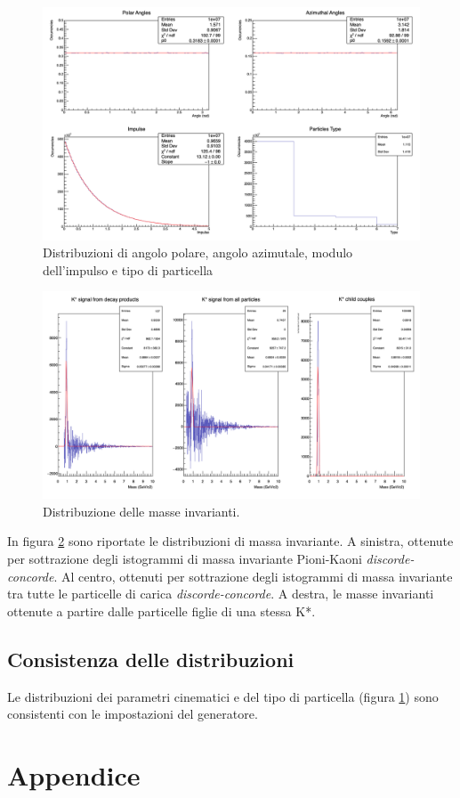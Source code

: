 \documentclass[12pt, a4paper]{article}
\begin{document}
\begin{figure}[H]
\centering
\includegraphics[scale=0.4]{images/DistributionsCanvas.png}

\label{fig:fig1}
\caption{Distribuzioni di angolo polare, angolo azimutale, modulo dell'impulso e tipo di particella}
\end{figure}

\begin{figure}[H]
\centering
\includegraphics[scale=0.4]{images/SignalCanvas.png}

\label{fig:fig2}
\caption{Distribuzione delle masse invarianti.}
\end{figure}

In figura \ref{fig:fig2} sono riportate le distribuzioni di massa invariante. A sinistra, ottenute per sottrazione degli istogrammi di massa invariante Pioni-Kaoni \textit{discorde-concorde}. Al centro, ottenuti per sottrazione degli istogrammi di massa invariante tra tutte le particelle di carica \textit{discorde-concorde}. A destra, le masse invarianti ottenute a partire dalle particelle figlie di una stessa K*.

\subsection{Consistenza delle distribuzioni}
Le distribuzioni dei parametri cinematici e del tipo di particella (figura \ref{fig:fig1}) sono consistenti con le impostazioni del generatore.


\section{Appendice}
\end{document}
